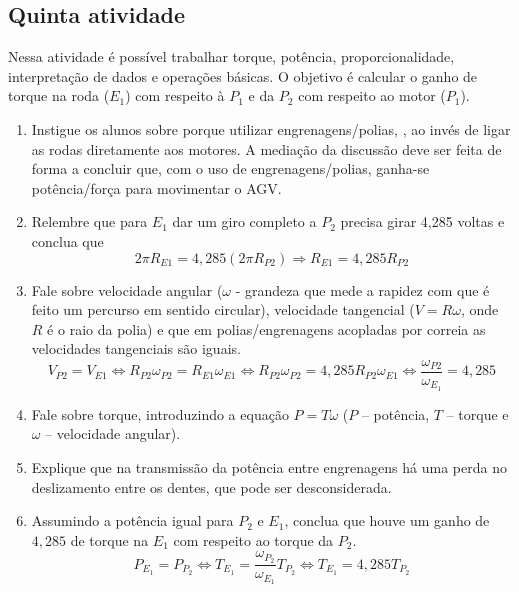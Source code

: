 \documentclass{textolivre}
\begin{document}
\subsection{Quinta atividade}\label{sec-quinta}
Nessa atividade é possível trabalhar torque, potência, proporcionalidade,
interpretação de dados e operações básicas. O objetivo é calcular o ganho de
torque na roda ($E_1$) com respeito à  $P_1$ e da $P_2$ com respeito ao motor
($P_1$).

\begin{enumerate}
\item Instigue os alunos sobre porque utilizar engrenagens/polias,
, ao invés de ligar as rodas diretamente aos motores. A mediação
da discussão deve ser feita de forma a concluir que, com o uso de
engrenagens/polias, ganha-se potência/força para movimentar o AGV.

\item Relembre que para $E_1$ dar um giro completo a $P_2$ precisa girar 4,285 voltas e conclua que
\begin{equation*}
2\pi R_{E1} = 4,285 (2\pi R_{P2}) \Rightarrow R_{E1} = 4,285 R_{P2}
\end{equation*}

\item Fale sobre velocidade angular ($\omega$ - grandeza que mede a rapidez com que é feito um percurso em sentido circular), velocidade tangencial ($V=R\omega$, onde $R$ é o raio da polia) e que em polias/engrenagens acopladas por correia as velocidades tangenciais são iguais.
\begin{equation*}
V_{P2} = V_{E1} \Leftrightarrow R_{P2} \omega_{P2} = R_{E1} \omega_{E1} \Leftrightarrow R_{P2} \omega_{P2} = 4,285 R_{P2} \omega_{E1} \Leftrightarrow \frac{\omega_{P2}}{\omega_{E_1}} = 4,285
\end{equation*}

\item Fale sobre torque, introduzindo a equação $P= T \omega$  ($P$ -- potência, $T$ -- torque e $\omega$ -- velocidade angular).

\item Explique que na transmissão da potência entre engrenagens há uma perda no deslizamento entre os dentes, que pode ser desconsiderada.

\item Assumindo a potência igual para $P_2$ e $E_1$, conclua que houve um ganho de $4,285$ de torque na $E_1$ com respeito ao torque da $P_2$.
\begin{equation*}
P_{E_1} = P_{P_2} \Leftrightarrow T_{E_1} = \frac{\omega_{P_2}}{\omega_{E_1}} T_{P_2} \Leftrightarrow T_{E_1} = 4,285 T_{P_2}
\end{equation*}


\end{enumerate}
\end{document}
